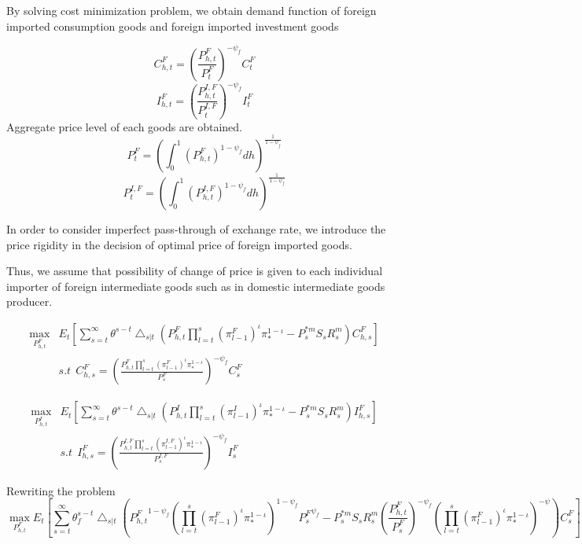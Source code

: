 \documentclass[11pt, a4paper]{article}
\begin{document}
By solving cost minimization problem, we obtain demand function of foreign imported consumption goods and foreign imported investment goods 

  \begin{displaymath}
  C_{h,t}^F =  \left(\frac{P_{h,t}^F}{P_t^F} \right)^{-\psi_f} C_t^F
 \end{displaymath}
   \begin{displaymath}
  I_{h,t}^F =  \left(\frac{P_{h,t}^{I,F}}{P_t^{I,F}} \right)^{-\psi_f} I_t^F
 \end{displaymath}
 Aggregate price level of each goods are obtained.
  \begin{displaymath}
  P_{t}^F =  \left(\int_0^1 {(P_{h,t}^F)}^{1-\psi_f} dh \right)^{\frac{1}{1-\psi_f}} 
 \end{displaymath}
   \begin{displaymath}
  P_{t}^{I,F} =  \left(\int_0^1 {(P_{h,t}^{I,F})}^{1-\psi_f} dh \right)^{\frac{1}{1-\psi_f}} 
 \end{displaymath}

In order to consider imperfect pass-through of exchange rate, we introduce the price rigidity in the decision of optimal price of foreign imported goods.

 Thus, we assume that possibility of change of price is given to each individual importer of foreign intermediate goods such as in domestic intermediate goods producer. 

 \begin{eqnarray*}
\max_{P_{h,t}^F}& E_t \left[  \sum_{s=t}^{\infty}  \theta^{s-t}  \bigtriangleup_{s|t} \left(P_{h,t}^F  \prod_{l=t}^s {(\pi_{l-1}^F)}^\iota \pi_*^{1-\iota} - P_s^{*m} S_s R_s^m  \right)C_{h,s}^F \right] \\
&s.t ~~ C_{h,s}^F  = \left(  \frac{P_{h,t}^F \prod_{l=t}^s {(\pi_{l-1}^F)}^\iota \pi_*^{1-\iota}}{P_s^F} \right)^{-\psi_f} C_s^F \end{eqnarray*}

 \begin{eqnarray*}
\max_{P_{h,t}^I}& E_t \left[  \sum_{s=t}^{\infty}  \theta^{s-t}  \bigtriangleup_{s|t} \left(P_{h,t}^I  \prod_{l=t}^s {(\pi_{l-1}^I)}^\iota \pi_*^{1-\iota} - P_s^{*m} S_s R_s^m \right)I_{h,s}^F\right] \\
&s.t ~~ I_{h,s}^F  = \left(  \frac{P_{h,t}^{I,F} \prod_{l=t}^s {(\pi_{l-1}^{I,F})}^\iota \pi_*^{1-\iota}}{P_s^{I,F}} \right)^{-\psi_f} I_s^F \end{eqnarray*}

 Rewriting the problem  \scriptsize
 \begin{displaymath}
 \max_{P_{h,t}^F} E_t \left[  \sum_{s=t}^{\infty}  \theta_f^{s-t}  \bigtriangleup_{s|t} \left({P_{h,t}^F}^{1-\psi_f} \left(  { \prod_{l=t}^s {(\pi_{l-1}^F)}^\iota \pi_*^{1-\iota}} \right)^{1-\psi_f} {P_s^F}^{\psi_f}  - P_s^{*m} S_s R_s^m {\left(\frac{P_{h,t}^F} {P_{s}^F}\right)}^{-\psi_f} \left(  { \prod_{l=t}^s {(\pi_{l-1}^F)}^\iota \pi_*^{1-\iota}}\right)^{-\psi}  \right)C_s^F\right] 
\end{displaymath} 
\end{document}
